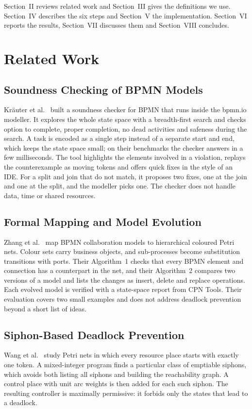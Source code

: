 \documentclass[conference]{IEEEtran}
\begin{document}
Section~II reviews related work and Section~III gives the definitions we use. Section~IV describes the six
steps and Section~V the implementation. Section~VI reports the results, Section~VII discusses them and
Section~VIII concludes.

\section{Related Work}

\subsection{Soundness Checking of BPMN Models}
Kr\"auter et al.~\cite{kraeuter} built a soundness checker for BPMN that runs inside the bpmn.io modeller.
It explores the whole state space with a breadth-first search and checks option to complete, proper
completion, no dead activities and safeness during the search. A task is encoded as a single step instead of a
separate start and end, which keeps the state space small; on their benchmarks the checker answers in a few
milliseconds. The tool highlights the elements involved in a violation, replays the counterexample as moving
tokens and offers quick fixes in the style of an IDE. For a split and join that do not match, it proposes
two fixes, one at the join and one at the split, and the modeller picks one. The checker does not handle data,
time or shared resources.

\subsection{Formal Mapping and Model Evolution}
Zhang et al.~\cite{zhang} map BPMN collaboration models to hierarchical coloured Petri nets. Colour sets carry
business objects, and sub-processes become substitution transitions with ports. Their Algorithm~1 checks that
every BPMN element and connection has a counterpart in the net, and their Algorithm~2 compares two versions of
a model and lists the changes as insert, delete and replace operations. Each evolved model is verified with a
state-space report from CPN Tools. Their evaluation covers two small examples and does not address deadlock
prevention beyond a short list of ideas.

\subsection{Siphon-Based Deadlock Prevention}
Wang et al.~\cite{wang} study Petri nets in which every resource place starts with exactly one token. A
mixed-integer program finds a particular class of emptiable siphons, which avoids both listing all siphons and
building the reachability graph. A control place with unit arc weights is then added for each such siphon. The
resulting controller is maximally permissive: it forbids only the states that lead to a deadlock.
\end{document}
